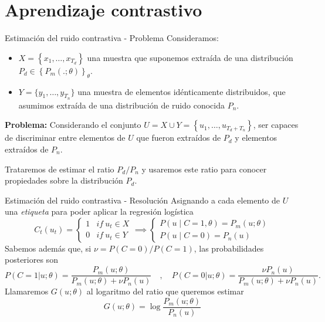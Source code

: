 \documentclass[aspectratio=169]{beamer}
\begin{document}
  \section{Aprendizaje contrastivo}

  \begin{frame}{Estimación del ruido contrastiva - Problema}
    Consideramos: 
    \begin{itemize}
      \item \( X = \left\{x_1,\dots,x_{T_d}\right\}\) una muestra que suponemos extraída de una distribución \( P_d \in \left\{P_m(.;\theta)\right\}_\theta \).
      \item \( Y = \{ y_1,\dots,y_{T_n}\}\) una muestra de elementos idénticamente distribuidos, que asumimos extraída de una distribución de ruido conocida \( P_n\).

    \end{itemize}
  
    \begin{shaded}
      \textbf{Problema:} Considerando el conjunto \(U = X \cup Y = \left\{u_1,\dots,u_{T_d+T_n}\right\}\), ser capaces de discriminar entre elementos de \(U\) que fueron extraídos de \(P_d\) y elementos extraídos de \(P_n\).
    \end{shaded}

    Trataremos de estimar el ratio \(P_d/P_n\) y usaremos este ratio para conocer propiedades sobre la distribución \(P_d\).
  \end{frame}
  \begin{frame}{Estimación del ruido contrastiva - Resolución}
    Asignando a cada elemento de \(U\) una \emph{etiqueta} para poder aplicar la regresión logística
    \[
      C_t(u_t) = \begin{cases}
      1 & if \ u_t \in X\\
      0 & if \ u_t \in Y
      \end{cases} \implies \begin{cases}
        P(u\mid C = 1,\theta) = P_m(u;\theta) \\
         P(u\mid C = 0) = P_n(u)
        \end{cases}
    \]
    Sabemos además que, si \(\nu = P(C = 0)/P(C=1)\), las probabilidades posteriores son
    \[
      P(C=1|u;\theta) = \frac{P_m(u;\theta)}{P_m(u;\theta) + \nu P_n(u)} \quad , \quad P(C = 0|u; \theta)  =  \frac{\nu P_n(u)}{P_m(u;\theta) + \nu P_n(u)}.
\]
    Llamaremos \(G(u;\theta)\) al logaritmo del ratio que queremos estimar 
    \[
      G(u;\theta) = \log \frac{P_m(u;\theta)}{P_n(u)} 
      \]
  \end{frame}
\end{document}
